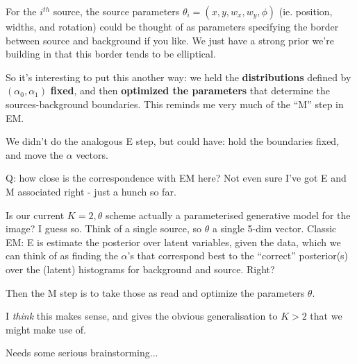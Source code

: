 \documentclass[12pt]{article}
\begin{document}
For the $i^{th}$ source, the source parameters $\theta_i =
(x,y,w_x,w_y,\phi)$ (ie. position, widths, and rotation) could be
thought of as parameters specifying the border between source and
background if you like. We just have a strong prior we're building in
that this border tends to be elliptical.

So it's interesting to put this another way: we held the  {\bf distributions} defined by
$(\alpha_0,\alpha_1)$ {\bf fixed}, and then {\bf optimized the parameters} that
determine the sources-background boundaries.
This reminds me very much of the ``M'' step in EM. 

We didn't do the analogous E step, but could have: hold the
boundaries fixed, and move the $\alpha$ vectors.

Q: how close is the correspondence with EM here? Not even sure I've
got E and M associated right - just a hunch so far.

Is our current $K=2, \theta$ scheme actually a parameterised
generative model for the image? I guess so. Think of a single source,
so $\theta$ a single 5-dim vector. Classic EM: E is estimate the
posterior over latent variables, given the data, which we can think of
as finding the $\alpha$'s that correspond best to the ``correct''
posterior(s) over the (latent) histograms for background and
source. Right?

Then the M step is to take those as read and optimize the parameters $\theta$.

I {\it think} this makes sense, and gives the obvious generalisation
to $K>2$ that we might make use of.

Needs some serious brainstorming...
\end{document}
